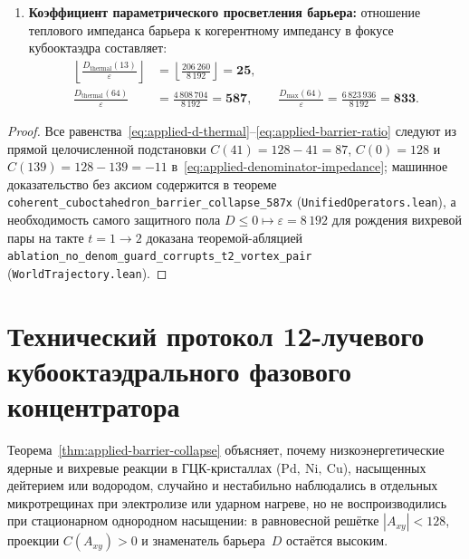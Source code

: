 \begin{theorem}
\begin{enumerate}[leftmargin=*]
  \[
    D_{\mathrm{coherent}}(64) \;=\; \varepsilon \;=\; 8\,192.
  \]
\item \textbf{Коэффициент параметрического просветления барьера:}
  отношение теплового импеданса барьера к когерентному импедансу в фокусе кубооктаэдра составляет:
  \begin{equation}
  \label{eq:applied-barrier-ratio}
  \begin{aligned}
    \left\lfloor\frac{D_{\mathrm{thermal}}(13)}{\varepsilon}\right\rfloor &= \left\lfloor\frac{206\,260}{8\,192}\right\rfloor = \mathbf{25}, \\
    \frac{D_{\mathrm{thermal}}(64)}{\varepsilon} &= \frac{4\,808\,704}{8\,192} = \mathbf{587},
    \qquad
    \frac{D_{\max}(64)}{\varepsilon} = \frac{6\,823\,936}{8\,192} = \mathbf{833}.
  \end{aligned}
  \end{equation}
\end{enumerate}
\end{theorem}

\begin{proof}
Все равенства~\eqref{eq:applied-d-thermal}--\eqref{eq:applied-barrier-ratio} следуют из прямой целочисленной подстановки $C(41) = 128 - 41 = 87$, $C(0) = 128$ и $C(139) = 128 - 139 = -11$ в~\eqref{eq:applied-denominator-impedance}; машинное доказательство без аксиом содержится в теореме \texttt{coherent\_\allowbreak cuboctahedron\_\allowbreak barrier\_\allowbreak collapse\_\allowbreak 587x} (\texttt{UnifiedOperators.lean}), а необходимость самого защитного пола $D\le 0\mapsto\varepsilon=8\,192$ для рождения вихревой пары на такте $t=1\to 2$ доказана теоремой-абляцией \texttt{ablation\_\allowbreak no\_\allowbreak denom\_\allowbreak guard\_\allowbreak corrupts\_\allowbreak t2\_\allowbreak vortex\_\allowbreak pair} (\texttt{WorldTrajectory.lean}).
\end{proof}

\section{Технический протокол 12-лучевого кубооктаэдрального фазового концентратора}
\label{sec:applied-12beam-protocol}

Теорема~\ref{thm:applied-barrier-collapse} объясняет, почему низкоэнергетические ядерные и вихревые реакции в ГЦК-кристаллах ($\mathrm{Pd},\ \mathrm{Ni},\ \mathrm{Cu}$), насыщенных дейтерием или водородом, случайно и нестабильно наблюдались в отдельных микротрещинах при электролизе или ударном нагреве, но не воспроизводились при стационарном однородном насыщении:
в равновесной решётке $|A_{xy}| < 128$, проекции $C(A_{xy}) > 0$ и знаменатель барьера~$D$ остаётся высоким.

